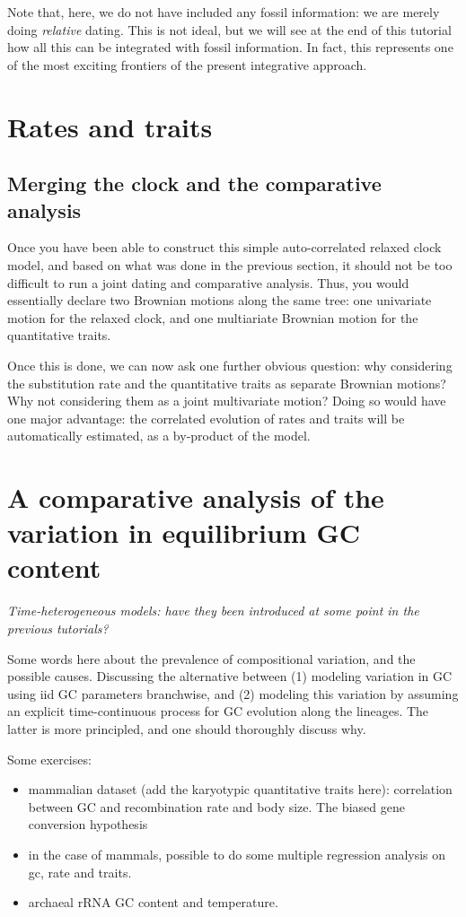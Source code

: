 \documentclass[11pt, oneside]{article}   	%
\begin{document}
Note that, here, we do not have included any fossil information: we are merely doing \emph{relative} dating. This is not ideal, but we will see at the end of this tutorial how all this can be integrated with fossil information. In fact, this represents one of the most exciting frontiers of the present integrative approach.

\section{Rates and traits}

\subsection{Merging the clock and the comparative analysis}

Once you have been able to construct this simple auto-correlated relaxed clock model, and based on what was done in the previous section, it should not be too difficult to run a joint dating and comparative analysis. Thus, you would essentially declare two Brownian motions along the same tree: one univariate motion for the relaxed clock, and one multiariate Brownian motion for the quantitative traits.

Once this is done, we can now ask one further obvious question: why considering the substitution rate and the quantitative traits as separate Brownian motions? Why not considering them as a joint multivariate motion? Doing so would have one major advantage: the correlated evolution of rates and traits will be automatically estimated, as a by-product of the model.

\section{A comparative analysis of the variation in equilibrium GC content}

\emph{Time-heterogeneous models: have they been introduced at some point in the previous tutorials?}

Some words here about the prevalence of compositional variation, and the possible causes. Discussing the alternative between (1) modeling variation in GC using iid GC parameters branchwise, and (2) modeling this variation by assuming an explicit time-continuous process for GC evolution along the lineages. The latter is more principled, and one should thoroughly discuss why.

Some exercises: 
\begin{itemize}
\item
mammalian dataset (add the karyotypic quantitative traits here): correlation between GC and recombination rate and body size. The biased gene conversion hypothesis
\item
in the case of mammals, possible to do some multiple regression analysis on gc, rate and traits.
\item
archaeal rRNA GC content and temperature.
\end{itemize}
\end{document}

